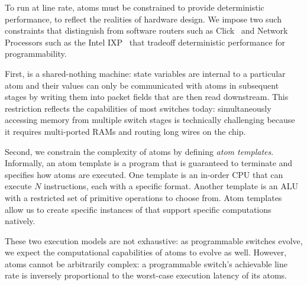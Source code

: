 To run at line rate, atoms must be constrained to provide deterministic
performance, to reflect the realities of hardware design. We impose two such
constraints that distinguish \absmachine from software routers such as
Click~\cite{click} and Network Processors such as the Intel IXP~\cite{ixp4xx}
that tradeoff deterministic performance for programmability.

First, \absmachine is a shared-nothing machine: state variables are
internal to a particular atom and their values can only be
communicated with atoms in subsequent stages by writing them into
packet fields that are then read downstream.  This restriction
reflects the capabilities of most switches today: simultaneously
accessing memory from multiple switch stages is technically
challenging because it requires multi-ported RAMs and routing long
wires on the chip.

Second, we constrain the complexity of atoms by defining {\it atom templates}.
Informally, an atom template is a program that is guaranteed to terminate and
specifies how atoms are executed. One template is an in-order CPU that can
execute $N$ instructions, each with a specific format. Another template is an
ALU with a restricted set of primitive operations to choose from. Atom
templates allow us to create specific instances of \absmachine that support
specific computations natively.

These two execution models are not exhaustive: as programmable switches evolve,
we expect the computational capabilities of atoms to evolve as well. However,
atoms cannot be arbitrarily complex: a programmable switch's achievable line
rate is inversely proportional to the worst-case execution latency of its
atoms.
